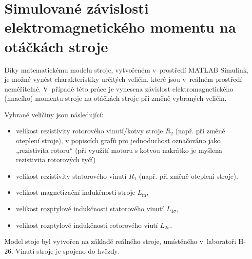 \documentclass[a4paper, twoside, 11pt]{article}
\begin{document}
\section{Simulované závislosti elektromagnetického momentu na otáčkách stroje}
    Díky matematickému modelu stroje, vytvořeném v~prostředí MATLAB Simulink, je možné vynést charakteristiky určitých veličin, které jsou v~reálném prostředí neměřitelné. V~případě této práce je vynesena závislost elektromagnetického (hnacího) momentu stroje na otáčkách stroje při změně vybraných veličin.\par
    \vspace*{0.5cm}
    Vybrané veličiny jsou následující:
    \begin{itemize}
        \item velikost rezistivity rotorového vinutí/kotvy stroje $R_2$ (např. při změně oteplení stroje), v popiscích grafů pro jednoduchost označováno jako „rezistivita rotoru“ (při využití motoru s kotvou nakrátko je myšlena rezistivita rotorových tyčí)
        \item velikost rezistivity statorového vinutí $R_1$ (např. při změně oteplení stroje),
        \item velikost magnetizační indukčnosti stroje $L_\text{m}$,
        \item velikost rozptylové indukčnosti statorového vinutí $L_{1\sigma}$,
        \item velikost rozptylové indukčnosti rotorového viutí $L_{2\sigma}$.
    \end{itemize}

    \vspace*{0.5cm}
    \noindent Model stoje byl vytvořen na základě reálného stroje, umístěného v~laboratoři H-26. Vinutí stroje je spojeno do hvězdy.\par
\end{document}
